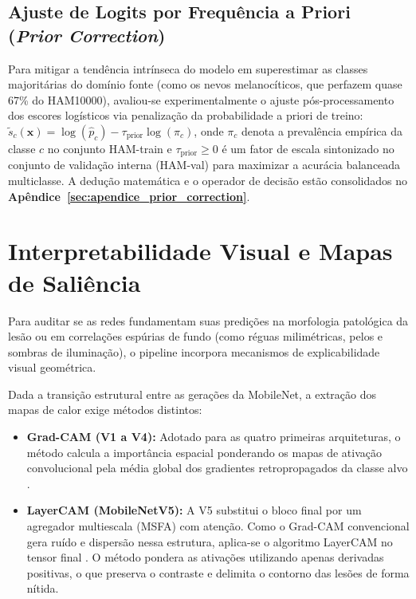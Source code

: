 \documentclass[oneside,english,brazilian]{UNISINOSmonografia}
\begin{document}
\subsection{Ajuste de Logits por Frequência a Priori (\textit{Prior Correction})}
\label{sec:prior_correction_method}
Para mitigar a tendência intrínseca do modelo em superestimar as classes majoritárias do domínio fonte (como os nevos melanocíticos, que perfazem quase 67\% do HAM10000), avaliou-se experimentalmente o ajuste pós-processamento dos escores logísticos via penalização da probabilidade a priori de treino: $\tilde{s}_c(\mathbf{x}) = \log(\hat{p}_c) - \tau_{\text{prior}} \log(\pi_c)$, onde $\pi_c$ denota a prevalência empírica da classe $c$ no conjunto HAM-train e $\tau_{\text{prior}} \ge 0$ é um fator de escala sintonizado no conjunto de validação interna (HAM-val) para maximizar a acurácia balanceada multiclasse. A dedução matemática e o operador de decisão estão consolidados no \textbf{Apêndice~\ref{sec:apendice_prior_correction}}.

\section{Interpretabilidade Visual e Mapas de Saliência}

Para auditar se as redes fundamentam suas predições na morfologia patológica da lesão ou em correlações espúrias de fundo (como réguas milimétricas, pelos e sombras de iluminação), o pipeline incorpora mecanismos de explicabilidade visual geométrica.

Dada a transição estrutural entre as gerações da MobileNet, a extração dos mapas de calor exige métodos distintos:
\begin{itemize}
    \item \textbf{Grad-CAM (V1 a V4):} Adotado para as quatro primeiras arquiteturas, o método calcula a importância espacial ponderando os mapas de ativação convolucional pela média global dos gradientes retropropagados da classe alvo \cite{selvaraju2017gradcam}.
    \item \textbf{LayerCAM (MobileNetV5):} A V5 substitui o bloco final por um agregador multiescala (MSFA) com atenção. Como o Grad-CAM convencional gera ruído e dispersão nessa estrutura, aplica-se o algoritmo LayerCAM no tensor final \cite{jiang2021layercam}. O método pondera as ativações utilizando apenas derivadas positivas, o que preserva o contraste e delimita o contorno das lesões de forma nítida.
\end{itemize}
\end{document}
